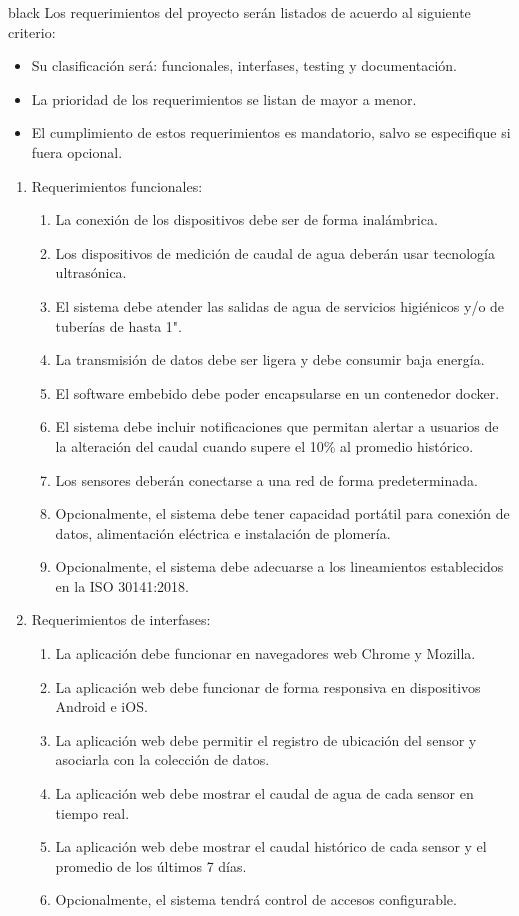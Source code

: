 \documentclass[
11pt, %
codirector, %
]{charter}
\begin{document}
\begin{consigna}{black}
Los requerimientos del proyecto serán listados de acuerdo al siguiente criterio:
\begin{itemize}
	\item Su clasificación será: funcionales, interfases, testing y documentación.
	\item La prioridad de los requerimientos se listan de mayor a menor.
	\item El cumplimiento de estos requerimientos es mandatorio, salvo se especifique si fuera opcional.
\end{itemize}

\begin{enumerate}

\item Requerimientos funcionales:
	\begin{enumerate}
		\item La conexión de los dispositivos debe ser de forma inalámbrica.
		\item Los dispositivos de medición de caudal de agua deberán usar tecnología ultrasónica.
		\item El sistema debe atender las salidas de agua de servicios higiénicos y/o de tuberías de hasta 1".
		\item La transmisión de datos debe ser ligera y debe consumir baja energía. 
		\item El software embebido debe poder encapsularse en un contenedor docker.
		\item El sistema debe incluir notificaciones que permitan alertar a usuarios de la alteración del caudal cuando supere el 10\% al promedio histórico.	
		\item Los sensores deberán conectarse a una red de forma predeterminada.	
		\item Opcionalmente, el sistema debe tener capacidad portátil para conexión de datos, alimentación eléctrica e instalación de plomería.
		\item Opcionalmente, el sistema debe adecuarse a los lineamientos establecidos en la ISO 30141:2018.
	\end{enumerate}

\item Requerimientos de interfases:
	\begin{enumerate}
		\item La aplicación debe funcionar en navegadores web Chrome y Mozilla.
		\item La aplicación web debe funcionar de forma responsiva en dispositivos Android e iOS.
		\item La aplicación web debe permitir el registro de ubicación del sensor y asociarla con la colección de datos.
		\item La aplicación web debe mostrar el caudal de agua de cada sensor en tiempo real. 
		\item La aplicación web debe mostrar el caudal histórico de cada sensor y el promedio de los últimos 7 días.
		\item Opcionalmente, el sistema tendrá control de accesos configurable.
	\end{enumerate}


\end{enumerate}
\end{consigna}
\end{document}
